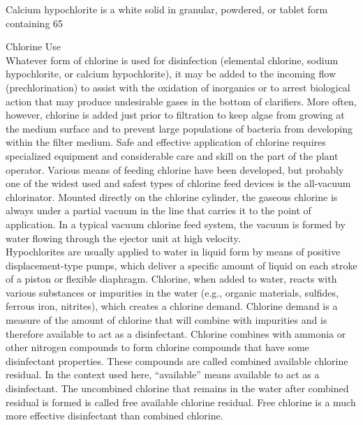 \documentclass{article}
\begin{document}
Calcium hypochlorite is a white solid in granular, powdered, or tablet form containing 65%

Chlorine Use\\
Whatever form of chlorine is used for disinfection (elemental chlorine, sodium hypochlorite, or calcium hypochlorite), it may be added to the incoming flow (prechlorination) to assist with the oxidation of inorganics or to arrest biological action that may produce undesirable gases in the bottom of clarifiers. More often, however, chlorine is added just prior to filtration to keep algae from growing at the medium surface and to prevent large populations of bacteria from developing within the filter medium. Safe and effective application of chlorine requires specialized equipment and considerable care and skill on the part of the plant operator. Various means of feeding chlorine have been developed, but probably one of the widest used and safest types of chlorine feed devices is the all-vacuum chlorinator. Mounted directly on the chlorine cylinder, the gaseous chlorine is always under a partial vacuum in the line that carries it to the point of application. In a typical vacuum chlorine feed system, the vacuum is formed by water flowing through the ejector unit at high velocity.\\
Hypochlorites are usually applied to water in liquid form by means of positive displacement-type pumps, which deliver a specific amount of liquid on each stroke of a piston or flexible diaphragm. Chlorine, when added to water, reacts with various substances or impurities in the water (e.g., organic materials, sulfides, ferrous iron, nitrites), which creates a chlorine demand. Chlorine demand is a measure of the amount of chlorine that will combine with impurities and is therefore available to act as a disinfectant. Chlorine combines with ammonia or other nitrogen compounds to form chlorine compounds that have some disinfectant properties. These compounds are called combined available chlorine residual. In the context used here, “available” means available to act as a disinfectant. The uncombined chlorine that remains in the water after combined residual is formed is called free available chlorine residual. Free chlorine is a much more effective disinfectant than combined chlorine.\\
\end{document}
